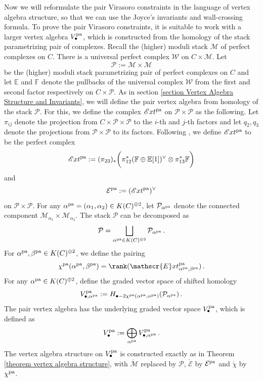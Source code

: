 \documentclass[11pt]{amsart}
\theoremstyle{remark}
\renewcommand{\P}{\mathcal{P}}
\newcommand{\mb}[1]{\mathbb{#1}}
\newcommand{\mc}[1]{\mathcal{#1}}
\newcommand{\F}{\mathbb{F}}
\newcommand{\E}{\mathbb{E}}
\newcommand{\M}{\mathcal{M}}
\newcommand{\Mdash}{\acute{\mathcal{M}}}
\newcommand{\W}{\mathcal{W}}
\newcommand{\EXT}[0]{\mathscr{E}xt}
\newcommand{\pa}[0]{\textnormal{pa}}
\numberwithin{theorem}{section}
\begin{document}
    Now we will reformulate the pair Virasoro constraints in the language of vertex algebra structure, so that we can use the Joyce's invariants and wall-crossing formula.
    To prove the pair Virasoro constraints, it is suitable to work with a larger vertex algebra $V^\pa_{\bullet}$, which is constructed from the homology of the stack parametrizing pair of complexes.
    Recall the (higher) moduli stack $\M$ of perfect complexes on $C$.
    There is a universal perfect complex $\W$ on $C \times \M$.
    Let 
    $$\P:= \M \times \M$$
    be the (higher) moduli stack parametrizing pair of perfect complexes on $C$
    and let $\E$ and $\mb F$ denote the pullbacks of the universal complex $\W$ from the first and second factor respectively on $C \times \P$.
    As in section \ref{section Vertex Algebra Structure and Invariants}, we will define the pair vertex algebra from homology of the stack $\P$.
    For this, we define the complex $\EXT^\pa$ on $\P \times \P$ as the following.
    Let $\pi_{ij}$ denote the projection from 
    $C \times \P \times \P$ to the $i$-th and $j$-th factors
    and let $q_2,q_3$ denote the projections from $\P \times \P$ to its factors. 
    Following \cite[Definition 4.4]{BLM24}, 
    we define $\EXT^\pa$ to be the perfect complex 
    \begin{align}\label{equation definition ext^pa}
        \EXT^\pa := (\pi_{23})_*\biggl(\pi_{12}^*(\F \oplus \E[1])^\vee \otimes \pi_{13}^*\F \biggr)
    \end{align}
    and 
    $$ \mc E ^\pa := (\EXT^\pa)^\vee$$
    on $\P \times \P$. 
    For any $\alpha^\pa = (\alpha_1,\alpha_2) \in K(C)^{\oplus 2}$,
    let $\P_{\alpha^\pa}$ denote the connected component $\M_{\alpha_1} \times \M_{\alpha_2}$.
    The stack $\P$ can be decomposed as 
    $$ \P= \bigsqcup_{\alpha^\pa \in K(C)^{\oplus 2}} \P_{\alpha^\pa} \,.$$
    For $\alpha^\pa, \beta^\pa \in K(C)^{\oplus 2}$,
    we define the pairing 
    $$\chi^\pa(\alpha^\pa,\beta^\pa) = \rank(\EXT^\pa_{\alpha^\pa,\beta^\pa})\,.$$
    For any $\alpha^\pa \in K(C)^{\oplus 2}$, 
    define the graded vector space of shifted homology
    $$ V^\pa_{\bullet, \alpha^\pa} := 
    H_{\bullet-2 \chi^\pa(\alpha^\pa,\alpha^\pa)}(\P_{\alpha^\pa})\,.$$
    The pair vertex algebra has the underlying graded vector space $V_\bullet^\pa$, which is defined as
    $$ V_\bullet^\pa := \bigoplus_{\alpha^\pa} V^\pa_{\bullet, \alpha^\pa}\,.$$
    The vertex algebra structure on $V_\bullet^\pa$
    is constructed exactly as in Theorem \ref{theorem vertex algebra structure}, with $\Mdash$ replaced by $\P$, $\acute{\mc E}$ by $\mc E^\pa$ and $\acute{\chi}$ by $\chi^\pa$.
\end{document}

